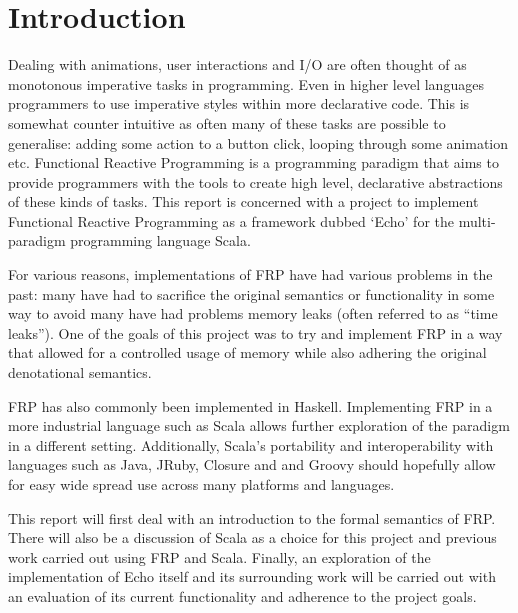 \chapter{Introduction}

  Dealing with animations, user interactions and I/O are often thought of as monotonous imperative tasks
  in programming. Even in higher level languages programmers to use imperative
  styles within more declarative code. This is somewhat counter intuitive as often many of these tasks are possible to generalise: adding
  some action to a button click, looping through some animation etc. Functional Reactive Programming
  is a programming paradigm that aims to provide programmers with the tools to create high level,
  declarative abstractions of these kinds of tasks. This report is concerned with a project to
  implement Functional Reactive Programming as a framework dubbed `Echo' \cite{Stott} for the multi-paradigm programming language
  Scala.

  For various reasons, implementations of FRP have had various problems in the past: many have had to sacrifice the original semantics or functionality in some way to avoid many have had problems
  memory leaks (often referred to as ``time leaks''). One of the goals
  of this project was to try and implement FRP in a way that allowed for a controlled usage of memory while also
  adhering the original denotational semantics. 
  
  FRP
  has also commonly been implemented in Haskell. Implementing FRP in a more industrial language such as Scala allows
  further exploration of the paradigm in a different setting. Additionally, Scala's portability and interoperability with
  languages such as Java, JRuby, Closure and and Groovy should hopefully allow for easy wide spread use across many platforms and languages. 

  This report will first deal with an introduction to the formal semantics of FRP. There will also be a discussion of Scala as a 
  choice for this project and previous work carried out using FRP and Scala.
  Finally, an exploration of the implementation of Echo itself and its surrounding work will be carried out with an
  evaluation of its current functionality and adherence to the project goals.